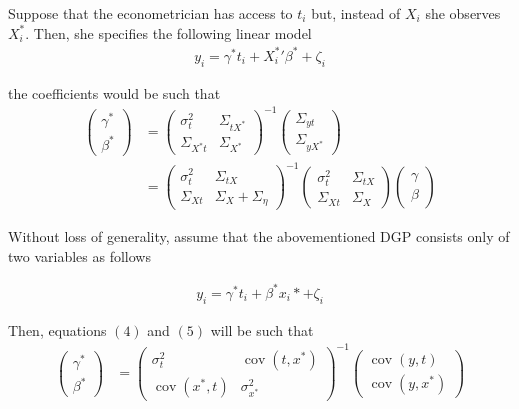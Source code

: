 \documentclass[12pt]{article}
\begin{document}
Suppose that the econometrician has access to $t_i$ but, instead of $X_i$ she observes $X^*_i$. Then, she specifies the following linear model
\begin{align}
    y_i = \gamma^* t_i + {X^{*}_i}' \beta^* + \zeta_i
\end{align}

the coefficients would be such that
\begin{align}
    \left(\begin{array}{l}
{\gamma}^* \\
{\beta}^*
\end{array}\right)&=\left(\begin{array}{cc}
{\sigma}^2_{t} & \Sigma_{tX^*} \\
\Sigma_{X^*t} & {\Sigma}_{X^*}
\end{array}\right)^{-1}\left(\begin{array}{c}
\Sigma_{yt} \\
\Sigma_{yX^*}
\end{array}\right) \\
& =\left(\begin{array}{cc}
{\sigma}^2_{t} & \Sigma_{tX} \\
\Sigma_{Xt} & {\Sigma}_{X}+{\Sigma}_{\eta}
\end{array}\right)^{-1}\left(\begin{array}{cc}
{\sigma}^2_{t} & \Sigma_{tX} \\
\Sigma_{Xt} & {\Sigma}_{X}
\end{array}\right)\left(\begin{array}{l}
{\gamma} \\
{\beta}
\end{array}\right)
\end{align}

Without loss of generality, assume that the abovementioned DGP consists only of two variables as follows

	 \begin{align}
            y_i = \gamma^* t_i +  \beta^*x_i* + \zeta_i
        \end{align}

	Then, equations $(4)$ and $(5)$ will be such that
	\begin{align}
            \left(\begin{array}{l}
        {\gamma}^* \\
        {\beta}^*
        \end{array}\right)&=\left(\begin{array}{cc}
        {\sigma}^2_{t} & \operatorname{cov}({t,x^*}) \\
        \operatorname{cov}({x^*,t}) & {\sigma}_{x^*}^2
        \end{array}\right)^{-1}\left(\begin{array}{c}
        \operatorname{cov}{(y,t)} \\
        \operatorname{cov}{(y,x^*)}
        \end{array}\right) \\
        \end{align}
	
\end{document}
